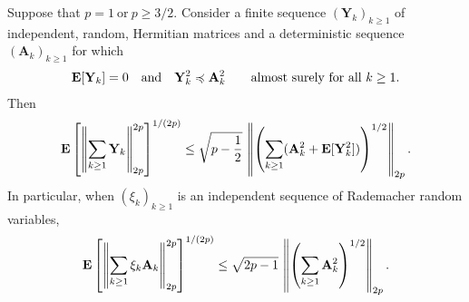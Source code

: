 \begin{ftheorem}
  \emph{\cite[Corollary~7.3]{Mackey2014}}
  Suppose that
  $
    p = 1
    \ 
    \text{or}\ 
    p \ge 3/2
    .
  $
  Consider a finite sequence
  $
    (\mathbf{Y}_k)_{k\ge 1}
  $
  of independent, random, Hermitian matrices 
  and a deterministic sequence
  $
    (\mathbf{A}_k)_{k\ge 1}
  $
  for which
  \begin{gather}
    \E[\mathbf{Y}_k]
    =
    0
    \quad 
    \text{and}
    \quad
    \mathbf{Y}_k^2
    \preccurlyeq
    \mathbf{A}_k^2
    \qquad
    \text{almost surely for all}\ 
    k \ge 1.
  \end{gather}
  Then
  \begin{gather}
      \mathbf{E}
      \left[
        \left\lVert
          \sum_{k\ge 1}
            \mathbf{Y}_k
        \right\rVert
        _{2p}
        ^{2p}
      \right]
      ^{1/(2p)}
      \le
      \sqrt{
        p - \frac{1}{2}
      }
      \,
      \left\lVert
        \left( 
          \sum_{k\ge 1}
          (
            \mathbf{A}_k^2
            + 
            \mathbf{E}[
              \mathbf{Y}_k^2
            ]
          )
        \right)
        ^{1/2}
        \right\rVert
      _{2p}
      .
  \end{gather}
  In particular, when 
  $
    (\xi_k)_{k\ge 1}
  $
  is an independent sequence of Rademacher random variables,
  \begin{gather}
      \mathbf{E}
      \left[
        \left\lVert
          \sum_{k\ge 1}
            \xi_k
            \mathbf{A}_k
        \right\rVert
        _{2p}
        ^{2p}
      \right]
      ^{1/(2p)}
      \le
      \sqrt{
        2p - 1
        }
      \,
      \left\lVert
        \left( 
          \sum_{k\ge 1}
            \mathbf{A}_k^2
        \right)
        ^{1/2}
        \right\rVert
      _{2p}
      .
  \end{gather}
\end{ftheorem}

